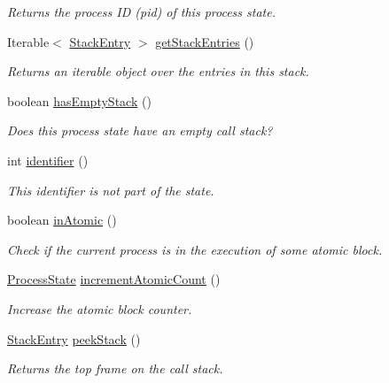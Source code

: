 \begin{DoxyCompactItemize}
\begin{DoxyCompactList}\small\item\em Returns the process I\+D (pid) of this process state. \end{DoxyCompactList}\item 
Iterable$<$ \hyperlink{interfaceedu_1_1udel_1_1cis_1_1vsl_1_1civl_1_1state_1_1IF_1_1StackEntry}{Stack\+Entry} $>$ \hyperlink{classedu_1_1udel_1_1cis_1_1vsl_1_1civl_1_1state_1_1common_1_1immutable_1_1ImmutableProcessState_a99517eec25635ec99bd607b6ca4f5331}{get\+Stack\+Entries} ()
\begin{DoxyCompactList}\small\item\em Returns an iterable object over the entries in this stack. \end{DoxyCompactList}\item 
boolean \hyperlink{classedu_1_1udel_1_1cis_1_1vsl_1_1civl_1_1state_1_1common_1_1immutable_1_1ImmutableProcessState_aed5729aefd94c5a468142aa0868899ec}{has\+Empty\+Stack} ()
\begin{DoxyCompactList}\small\item\em Does this process state have an empty call stack? \end{DoxyCompactList}\item 
int \hyperlink{classedu_1_1udel_1_1cis_1_1vsl_1_1civl_1_1state_1_1common_1_1immutable_1_1ImmutableProcessState_ab908fba02b613117ddabf0e32b675106}{identifier} ()
\begin{DoxyCompactList}\small\item\em This identifier is not part of the state. \end{DoxyCompactList}\item 
boolean \hyperlink{classedu_1_1udel_1_1cis_1_1vsl_1_1civl_1_1state_1_1common_1_1immutable_1_1ImmutableProcessState_a8717c0d252eca7a8f0c4ede87c3667c8}{in\+Atomic} ()
\begin{DoxyCompactList}\small\item\em Check if the current process is in the execution of some atomic block. \end{DoxyCompactList}\item 
\hyperlink{interfaceedu_1_1udel_1_1cis_1_1vsl_1_1civl_1_1state_1_1IF_1_1ProcessState}{Process\+State} \hyperlink{classedu_1_1udel_1_1cis_1_1vsl_1_1civl_1_1state_1_1common_1_1immutable_1_1ImmutableProcessState_af23028210a642b9dba74d8f3347e151c}{increment\+Atomic\+Count} ()
\begin{DoxyCompactList}\small\item\em Increase the atomic block counter. \end{DoxyCompactList}\item 
\hyperlink{interfaceedu_1_1udel_1_1cis_1_1vsl_1_1civl_1_1state_1_1IF_1_1StackEntry}{Stack\+Entry} \hyperlink{classedu_1_1udel_1_1cis_1_1vsl_1_1civl_1_1state_1_1common_1_1immutable_1_1ImmutableProcessState_abeedb8e756573f7e44183260b1fc4743}{peek\+Stack} ()
\begin{DoxyCompactList}\small\item\em Returns the top frame on the call stack.


\end{DoxyCompactList}
\end{DoxyCompactItemize}
